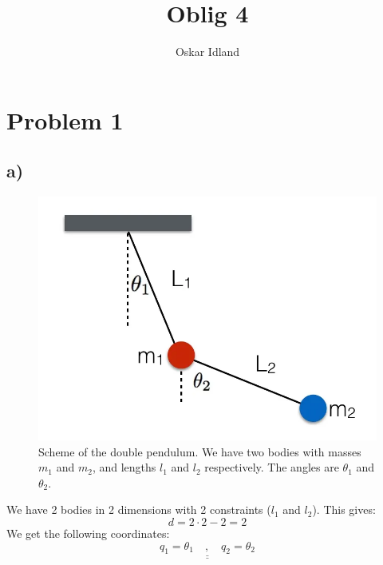 \documentclass{article}
\author{Oskar Idland}
\title{Oblig 4}
\date{}
\begin{document}
\maketitle
\newpage

\section*{Problem 1}
\subsection*{a)}
\begin{figure}[h!]
\centering
\includegraphics[width = \textwidth]{DoublePendulum.png}
\caption{Scheme of the double pendulum. We have two bodies with masses $m_1$ and $m_2$, and lengths $l_1$ and $l_2$ respectively. The angles are $θ_1$ and $θ_2$.}
\label{fig: 1a}
\end{figure}

We have 2 bodies in 2 dimensions with 2 constraints ($l_1$ and $l_2$). This gives:
\[
d = 2 ⋅ 2 - 2 = 2
\]
We get the following coordinates:
\[
\underline{\underline{q_1 = θ_1 \quad , \quad  q_2 = θ_2}}
\]
\end{document}
